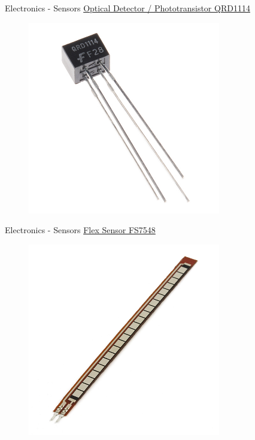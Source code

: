 \documentclass{beamer}
\begin{document}
\begin{frame}{Electronics - Sensors}
    \href{https://www.sparkfun.com/products/246}{Optical Detector / Phototransistor QRD1114}
    \begin{figure}[h]
        \includegraphics[width=0.75\textwidth]{optical.jpg}
    \end{figure}
\end{frame}

\begin{frame}{Electronics - Sensors}
    \href{https://www.sparkfun.com/products/8606}{Flex Sensor FS7548}
    \begin{figure}[h]
        \includegraphics[width=0.75\textwidth]{flex.jpg}
    \end{figure}
\end{frame}
\end{document}
